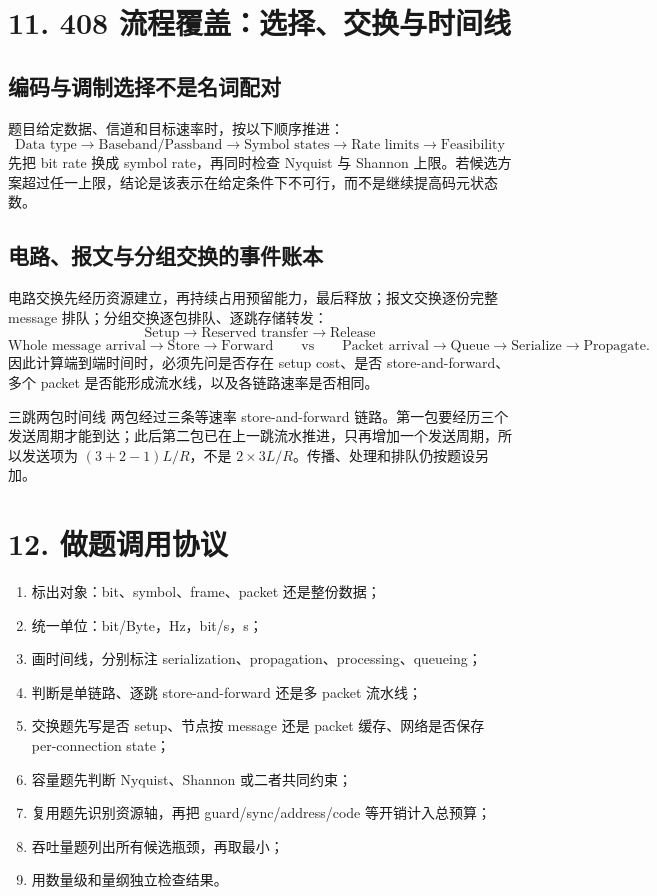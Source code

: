 \documentclass[UTF8,fontset=none,11pt,a4paper]{ctexart}
\providecommand{\tightlist}{\setlength{\itemsep}{0pt}\setlength{\parskip}{0pt}}
\begin{document}
\section{11. 408 流程覆盖：选择、交换与时间线}

\subsection{编码与调制选择不是名词配对}

题目给定数据、信道和目标速率时，按以下顺序推进：
\[
\boxed{\text{Data type}\to\text{Baseband/Passband}\to\text{Symbol states}\to\text{Rate limits}\to\text{Feasibility}}
\]
先把 bit rate 换成 symbol rate，再同时检查 Nyquist 与 Shannon 上限。若候选方案超过任一上限，结论是该表示在给定条件下不可行，而不是继续提高码元状态数。

\subsection{电路、报文与分组交换的事件账本}

电路交换先经历资源建立，再持续占用预留能力，最后释放；报文交换逐份完整 message 排队；分组交换逐包排队、逐跳存储转发：
\[
\text{Setup}\to\text{Reserved transfer}\to\text{Release}
\]
\[
\text{Whole message arrival}\to\text{Store}\to\text{Forward}
\qquad\text{vs}\qquad
\text{Packet arrival}\to\text{Queue}\to\text{Serialize}\to\text{Propagate}.
\]
因此计算端到端时间时，必须先问是否存在 setup cost、是否 store-and-forward、多个 packet 是否能形成流水线，以及各链路速率是否相同。

\begin{examplebox}{三跳两包时间线}
两包经过三条等速率 store-and-forward 链路。第一包要经历三个发送周期才能到达；此后第二包已在上一跳流水推进，只再增加一个发送周期，所以发送项为 $(3+2-1)L/R$，不是 $2\times3L/R$。传播、处理和排队仍按题设另加。
\end{examplebox}

\section{12. 做题调用协议}\label{9-ux505aux9898ux8c03ux7528ux534fux8bae}

\begin{enumerate}
\def\labelenumi{\arabic{enumi}.}
\tightlist
\item
  标出对象：bit、symbol、frame、packet 还是整份数据；
\item
  统一单位：bit/Byte，Hz，bit/s，s；
\item
  画时间线，分别标注 serialization、propagation、processing、queueing；
\item
  判断是单链路、逐跳 store-and-forward 还是多 packet 流水线；
\item
  交换题先写是否 setup、节点按 message 还是 packet 缓存、网络是否保存 per-connection state；
\item
  容量题先判断 Nyquist、Shannon 或二者共同约束；
\item
  复用题先识别资源轴，再把 guard/sync/address/code 等开销计入总预算；
\item
  吞吐量题列出所有候选瓶颈，再取最小；
\item
  用数量级和量纲独立检查结果。
\end{enumerate}
\end{document}
